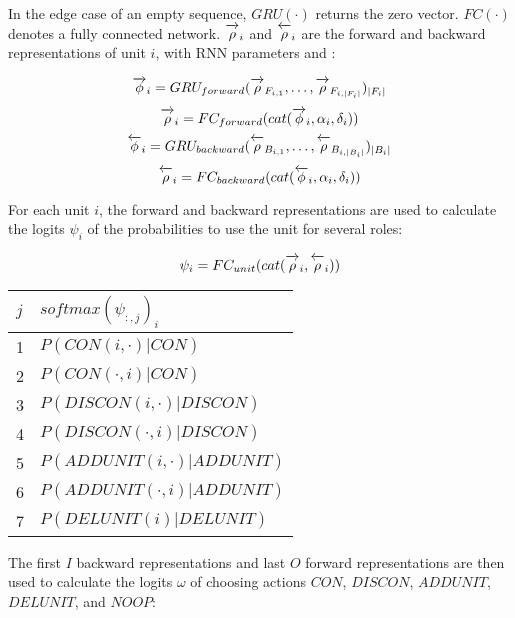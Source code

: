 \documentclass{article}[12px]
\newcommand{\ora}[1]{\overrightarrow{#1\vphantom{j}}}
\newcommand{\ola}[1]{\overleftarrow{#1\vphantom{j}}}
\begin{document}
In the edge case of an empty sequence, \(GRU(\cdot)\) returns the zero vector. \(FC(\cdot)\) denotes a fully connected network. \(\ora{\rho}_i\) and \(\ola{\rho}_i\) are the forward and backward representations of unit \(i\), with RNN parameters \ora{\theta} and \ola{\theta}:

\begin{equation}
  \ora{\phi}_i = GRU_{forward}(\ora{\rho}_{F_{i,1}}, \ldots, \ora{\rho}_{F_{i,|F_i|}})_{|F_i|}
\end{equation}
\begin{equation}
  \ora{\rho}_i = FC_{forward}(cat(\ora{\phi}_i, \alpha_i, \delta_i))
\end{equation}
\begin{equation}
  \ola{\phi}_i = GRU_{backward}(\ola{\rho}_{B_{i,1}}, \ldots, \ola{\rho}_{B_{i,|B_i|}})_{|B_i|}
\end{equation}
\begin{equation}
  \ola{\rho}_i = FC_{backward}(cat(\ola{\phi}_i, \alpha_i, \delta_i))
\end{equation}

For each unit \(i\), the forward and backward representations are used to calculate the logits \(\psi_i\) of the probabilities to use the unit for several roles:

\begin{equation}
  \psi_i = FC_{unit}(cat(\ora{\rho}_i, \ola{\rho}_i))
\end{equation}

\begin{center}
  \begin{tabular}{| l | l |}
    \hline
    \(j\) & \(softmax(\psi_{:,j})_i\) \\
    \hline
    1 & \(P(CON(i, \cdot) | CON)\) \\
    2 & \(P(CON(\cdot, i) | CON)\) \\
    3 & \(P(DISCON(i, \cdot) | DISCON)\) \\
    4 & \(P(DISCON(\cdot, i) | DISCON)\) \\
    5 & \(P(ADDUNIT(i, \cdot) | ADDUNIT)\) \\
    6 & \(P(ADDUNIT(\cdot, i) | ADDUNIT)\) \\
    7 & \(P(DELUNIT(i) | DELUNIT)\) \\
    \hline
  \end{tabular}
\end{center}

The first \(I\) backward representations and last \(O\) forward representations are then used to calculate the logits \(\omega\) of choosing actions \(CON\), \(DISCON\), \(ADDUNIT\), \(DELUNIT\), and \(NOOP\):
\end{document}
